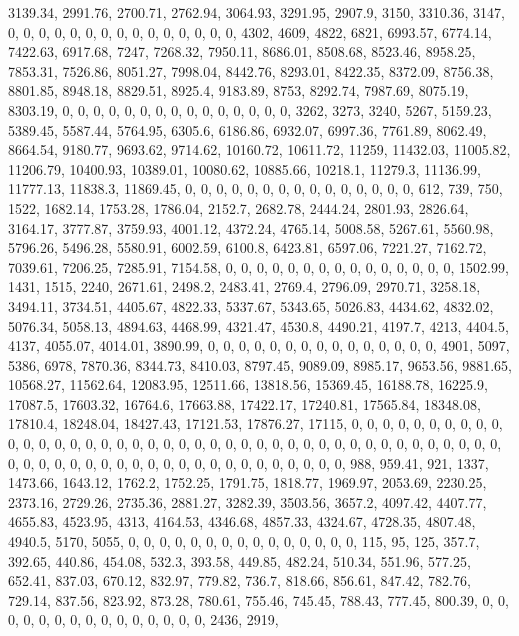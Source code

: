\documentclass[
]{article}
\begin{document}
3139.34, 2991.76, 2700.71, 2762.94, 3064.93, 3291.95, 2907.9, 3150,
3310.36, 3147, 0, 0, 0, 0, 0, 0, 0, 0, 0, 0, 0, 0, 0, 0, 0, 4302, 4609,
4822, 6821, 6993.57, 6774.14, 7422.63, 6917.68, 7247, 7268.32, 7950.11,
8686.01, 8508.68, 8523.46, 8958.25, 7853.31, 7526.86, 8051.27, 7998.04,
8442.76, 8293.01, 8422.35, 8372.09, 8756.38, 8801.85, 8948.18, 8829.51,
8925.4, 9183.89, 8753, 8292.74, 7987.69, 8075.19, 8303.19, 0, 0, 0, 0,
0, 0, 0, 0, 0, 0, 0, 0, 0, 0, 0, 3262, 3273, 3240, 5267, 5159.23,
5389.45, 5587.44, 5764.95, 6305.6, 6186.86, 6932.07, 6997.36, 7761.89,
8062.49, 8664.54, 9180.77, 9693.62, 9714.62, 10160.72, 10611.72, 11259,
11432.03, 11005.82, 11206.79, 10400.93, 10389.01, 10080.62, 10885.66,
10218.1, 11279.3, 11136.99, 11777.13, 11838.3, 11869.45, 0, 0, 0, 0, 0,
0, 0, 0, 0, 0, 0, 0, 0, 0, 0, 612, 739, 750, 1522, 1682.14, 1753.28,
1786.04, 2152.7, 2682.78, 2444.24, 2801.93, 2826.64, 3164.17, 3777.87,
3759.93, 4001.12, 4372.24, 4765.14, 5008.58, 5267.61, 5560.98, 5796.26,
5496.28, 5580.91, 6002.59, 6100.8, 6423.81, 6597.06, 7221.27, 7162.72,
7039.61, 7206.25, 7285.91, 7154.58, 0, 0, 0, 0, 0, 0, 0, 0, 0, 0, 0, 0,
0, 0, 0, 1502.99, 1431, 1515, 2240, 2671.61, 2498.2, 2483.41, 2769.4,
2796.09, 2970.71, 3258.18, 3494.11, 3734.51, 4405.67, 4822.33, 5337.67,
5343.65, 5026.83, 4434.62, 4832.02, 5076.34, 5058.13, 4894.63, 4468.99,
4321.47, 4530.8, 4490.21, 4197.7, 4213, 4404.5, 4137, 4055.07, 4014.01,
3890.99, 0, 0, 0, 0, 0, 0, 0, 0, 0, 0, 0, 0, 0, 0, 0, 4901, 5097, 5386,
6978, 7870.36, 8344.73, 8410.03, 8797.45, 9089.09, 8985.17, 9653.56,
9881.65, 10568.27, 11562.64, 12083.95, 12511.66, 13818.56, 15369.45,
16188.78, 16225.9, 17087.5, 17603.32, 16764.6, 17663.88, 17422.17,
17240.81, 17565.84, 18348.08, 17810.4, 18248.04, 18427.43, 17121.53,
17876.27, 17115, 0, 0, 0, 0, 0, 0, 0, 0, 0, 0, 0, 0, 0, 0, 0, 0, 0, 0,
0, 0, 0, 0, 0, 0, 0, 0, 0, 0, 0, 0, 0, 0, 0, 0, 0, 0, 0, 0, 0, 0, 0, 0,
0, 0, 0, 0, 0, 0, 0, 0, 0, 0, 0, 0, 0, 0, 0, 0, 0, 0, 0, 0, 0, 0, 988,
959.41, 921, 1337, 1473.66, 1643.12, 1762.2, 1752.25, 1791.75, 1818.77,
1969.97, 2053.69, 2230.25, 2373.16, 2729.26, 2735.36, 2881.27, 3282.39,
3503.56, 3657.2, 4097.42, 4407.77, 4655.83, 4523.95, 4313, 4164.53,
4346.68, 4857.33, 4324.67, 4728.35, 4807.48, 4940.5, 5170, 5055, 0, 0,
0, 0, 0, 0, 0, 0, 0, 0, 0, 0, 0, 0, 0, 115, 95, 125, 357.7, 392.65,
440.86, 454.08, 532.3, 393.58, 449.85, 482.24, 510.34, 551.96, 577.25,
652.41, 837.03, 670.12, 832.97, 779.82, 736.7, 818.66, 856.61, 847.42,
782.76, 729.14, 837.56, 823.92, 873.28, 780.61, 755.46, 745.45, 788.43,
777.45, 800.39, 0, 0, 0, 0, 0, 0, 0, 0, 0, 0, 0, 0, 0, 0, 0, 2436, 2919,
\end{document}

